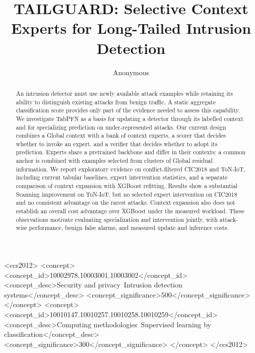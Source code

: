 \documentclass[sigconf,anonymous,pbalance]{acmart}
\begin{document}
\title{TAILGUARD: Selective Context Experts for Long-Tailed Intrusion Detection}
\author{Anonymous}

\begin{abstract}
An intrusion detector must use newly available attack examples while retaining its ability to distinguish existing attacks from benign traffic. A static aggregate classification score provides only part of the evidence needed to assess this capability. We investigate TabPFN as a basis for updating a detector through its labelled context and for specializing prediction on under-represented attacks. Our current design combines a Global context with a bank of context experts, a scorer that decides whether to invoke an expert, and a verifier that decides whether to adopt its prediction. Experts share a pretrained backbone and differ in their contexts: a common anchor is combined with examples selected from clusters of Global residual information. We report exploratory evidence on conflict-filtered CIC2018 and ToN-IoT, including current tabular baselines, expert intervention statistics, and a separate comparison of context expansion with XGBoost refitting. Results show a substantial Scanning improvement on ToN-IoT, but no selected expert intervention on CIC2018 and no consistent advantage on the rarest attacks. Context expansion also does not establish an overall cost advantage over XGBoost under the measured workload. These observations motivate evaluating specialization and intervention jointly, with attack-wise performance, benign false alarms, and measured update and inference costs.
\end{abstract}

\begin{CCSXML}
<ccs2012>
 <concept>
  <concept_id>10002978.10003001.10003002</concept_id>
  <concept_desc>Security and privacy~Intrusion detection systems</concept_desc>
  <concept_significance>500</concept_significance>
 </concept>
 <concept>
  <concept_id>10010147.10010257.10010258.10010259</concept_id>
  <concept_desc>Computing methodologies~Supervised learning by classification</concept_desc>
  <concept_significance>300</concept_significance>
 </concept>
</ccs2012>
\end{CCSXML}
\maketitle
\end{document}
